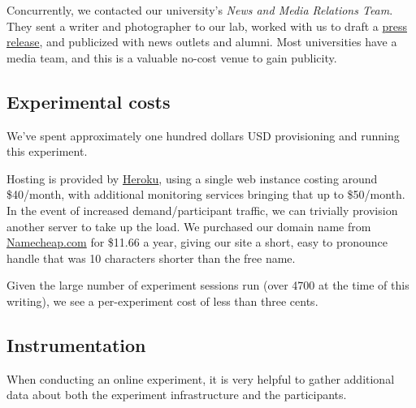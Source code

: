 Concurrently, we contacted our university's \emph{News and Media Relations Team}. They sent a writer and photographer to our lab, worked with us to draft a \href{http://news.rice.edu/2013/09/09/a-swarm-on-every-desktop-robotics-experts-learn-from-public/ }{press release}, and publicized with news outlets and alumni. Most universities have a media team, and this is a valuable no-cost venue to gain publicity.
 
\subsection{Experimental costs}

We've spent approximately one hundred dollars USD provisioning and running this experiment.

Hosting is provided by \href{Heroku.com}{Heroku}, using a single web instance costing around \$40/month, with additional monitoring services bringing that up to \$50/month. In the event of increased demand/participant traffic, we can trivially provision another server to take up the load.
We purchased our domain name from \href{Namecheap.com}{Namecheap.com} for \$11.66 a year, giving our site a short, easy to pronounce handle that was 10 characters shorter than the free name. 


Given the large number of experiment sessions run (over 4700 at the time of this writing), we see a per-experiment cost of less than three cents.

\subsection{Instrumentation}

When conducting an online experiment, it is very helpful to gather additional data about both the experiment infrastructure and the participants.

